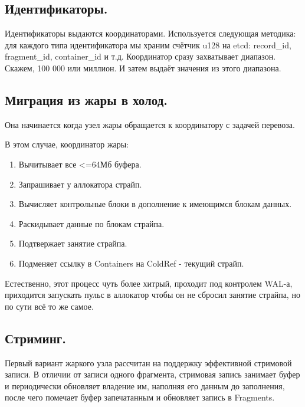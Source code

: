 \subsection{Идентификаторы.}\label{ux438ux434ux435ux43dux442ux438ux444ux438ux43aux430ux442ux43eux440ux44b.}

Идентификаторы выдаются координаторами. Используется следующая методика:
для каждого типа идентификатора мы храним счётчик u128 на etcd:
record\_id, fragment\_id, container\_id и т.д. Координатор сразу
захватывает диапазон. Скажем, 100 000 или миллион. И затем выдаёт
значения из этого диапазона.

\subsection{Миграция из жары в
холод.}\label{ux43cux438ux433ux440ux430ux446ux438ux44f-ux438ux437-ux436ux430ux440ux44b-ux432-ux445ux43eux43bux43eux434.}

Она начинается когда узел жары обращается к координатору с задачей
перевоза.

В этом случае, координатор жары:

\begin{enumerate}
\def\labelenumi{\arabic{enumi}.}
\tightlist
\item
  Вычитывает все \textless=64Мб буфера.
\item
  Запрашивает у аллокатора страйп.
\item
  Вычисляет контрольные блоки в дополнение к имеющимся блокам данных.
\item
  Раскидывает данные по блокам страйпа.
\item
  Подтвержает занятие страйпа.
\item
  Подменяет ссылку в Containers на ColdRef - текущий страйп.
\end{enumerate}

Естественно, этот процесс чуть более хитрый, проходит под контролем
WAL-а, приходится запускать пульс в аллокатор чтобы он не сбросил
занятие страйпа, но по сути всё то же самое.

\subsection{Стриминг.}\label{ux441ux442ux440ux438ux43cux438ux43dux433.}

Первый вариант жаркого узла рассчитан на поддержку эффективной стримовой
записи. В отличии от записи одного фрагмента, стримовая запись занимает
буфер и периодически обновляет владение им, наполняя его данным до
заполнения, после чего помечает буфер запечатанным и обновляет запись в
Fragments.


